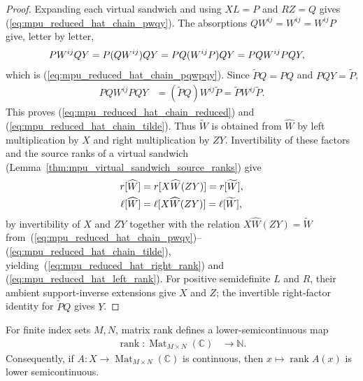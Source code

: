 \begin{proof}\leanok
    Expanding each virtual sandwich and using $XL=P$ and $RZ=Q$ gives
    (\ref{eq:mpu_reduced_hat_chain_pwqy}). The absorptions
    $QW^{ij}=W^{ij}=W^{ij}P$ give, letter by letter,
    \begin{align}
        PW^{ij}QY
         & =P(QW^{ij})QY=PQ(W^{ij}P)QY=PQW^{ij}PQY,
        \notag
    \end{align}
    which is (\ref{eq:mpu_reduced_hat_chain_pqwpqy}). Since
    $\widetilde P Q=PQ$ and $PQY=\widetilde P$,
    \begin{align}
        PQW^{ij}PQY
         & =(\widetilde P Q)W^{ij}\widetilde P
        =\widetilde P W^{ij}\widetilde P.
    \end{align}
    This proves (\ref{eq:mpu_reduced_hat_chain_reduced}) and
    (\ref{eq:mpu_reduced_hat_chain_tilde}). Thus $\widetilde W$ is obtained
    from $\widehat W$ by left multiplication by $X$ and right multiplication
    by $ZY$. Invertibility of these factors and the source ranks of a
    virtual sandwich (Lemma~\ref{thm:mpu_virtual_sandwich_source_ranks})
    give
    \begin{align}
        r[\widehat W]    & =r[X\widehat W(ZY)]=r[\widetilde W],
        \notag                                                        \\
        \ell[\widehat W] & =\ell[X\widehat W(ZY)]=\ell[\widetilde W],
        \notag
    \end{align}
    by invertibility of $X$ and $ZY$ together with the relation $X\widehat W(ZY)=\widetilde W$
    from~(\ref{eq:mpu_reduced_hat_chain_pwqy})--(\ref{eq:mpu_reduced_hat_chain_tilde}), yielding~(\ref{eq:mpu_reduced_hat_right_rank}) and
    (\ref{eq:mpu_reduced_hat_left_rank}). For positive semidefinite $L$ and
    $R$, their ambient support-inverse extensions give $X$ and $Z$; the
    invertible right-factor identity for $\widetilde P Q$ gives $Y$.
\end{proof}

\begin{lemma}
    \label{thm:mpu_rank_lower_semicontinuous}
    \leanok
    For finite index sets $M,N$, matrix rank defines a lower-semicontinuous map
    \begin{align}
        \operatorname{rank}\colon
        \operatorname{Mat}_{M\times N}(\mathbb C) & \longrightarrow\mathbb N.
    \end{align}
    Consequently, if $A\colon X\to\operatorname{Mat}_{M\times N}(\mathbb C)$
    is continuous, then $x\mapsto\operatorname{rank}A(x)$ is lower
    semicontinuous.
\end{lemma}

